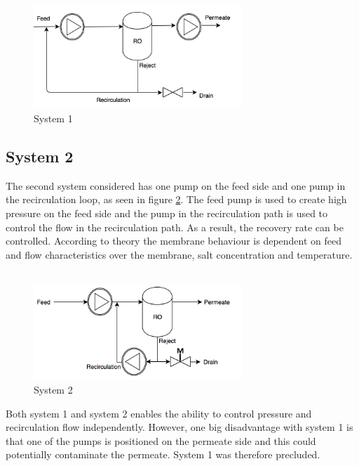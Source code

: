 \begin{figure}[H]
    \centering
    \includegraphics[width=0.7\textwidth]{FlowCInves1}
    \caption{System 1}
    \label{fig:FlowCInves1}
\end{figure}

\subsection{System 2}
The second system considered has one pump on the feed side and one pump in the recirculation loop, as seen in figure \ref{fig:Sys2}. The feed pump is used to create high pressure on the feed side and the pump in the recirculation path is used to control the flow in the recirculation path. As a result, the recovery rate can be controlled. According to theory the membrane behaviour is dependent on feed and flow characteristics over the membrane, salt concentration and temperature. \\
\\
\begin{figure}[H]
    \centering
    \includegraphics[width=0.7\textwidth]{Sys2}
    \caption{System 2}
    \label{fig:Sys2}
\end{figure}
Both system 1 and system 2 enables the ability to control pressure and recirculation flow independently. However, one big disadvantage with system 1 is that one of the pumps is positioned on the  permeate side and this could potentially contaminate the permeate. System 1 was therefore precluded.


